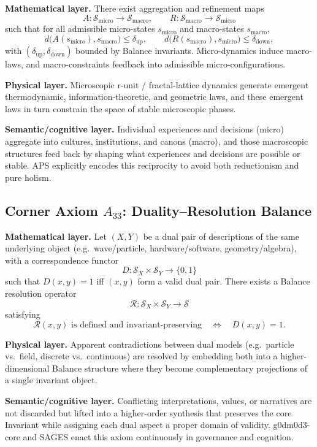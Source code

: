 \begin{axiom}
\label{ax:micro-macro}
\textbf{Mathematical layer.}
There exist aggregation and refinement maps
\[
  A : \mathcal{S}_{\mathrm{micro}} \to \mathcal{S}_{\mathrm{macro}},
  \qquad
  R : \mathcal{S}_{\mathrm{macro}} \to \mathcal{S}_{\mathrm{micro}}
\]
such that for all admissible micro-states $s_{\mathrm{micro}}$ and macro-states $s_{\mathrm{macro}}$,
\[
  d\bigl(A(s_{\mathrm{micro}}), s_{\mathrm{macro}}\bigr) \leq \delta_{\mathrm{up}},
  \qquad
  d\bigl(R(s_{\mathrm{macro}}), s_{\mathrm{micro}}\bigr) \leq \delta_{\mathrm{down}},
\]
with $(\delta_{\mathrm{up}},\delta_{\mathrm{down}})$ bounded by Balance invariants.
Micro-dynamics induce macro-laws, and macro-constraints feedback into admissible micro-configurations.

\textbf{Physical layer.}
Microscopic r-unit / fractal-lattice dynamics generate emergent thermodynamic, information-theoretic, and geometric laws, and these emergent laws in turn constrain the space of stable microscopic phases.\cite{AurphyxThesis,AurphyxFractalQC}

\textbf{Semantic/cognitive layer.}
Individual experiences and decisions (micro) aggregate into cultures, institutions, and canons (macro), and those macroscopic structures feed back by shaping what experiences and decisions are possible or stable.
APS explicitly encodes this reciprocity to avoid both reductionism and pure holism.
\end{axiom}

\subsection{Corner Axiom $A_{33}$: Duality–Resolution Balance}

\begin{axiom}
\label{ax:duality}
\textbf{Mathematical layer.}
Let $(X,Y)$ be a dual pair of descriptions of the same underlying object (e.g.\ wave/particle, hardware/software, geometry/algebra), with a correspondence functor
\[
  D : \mathcal{S}_X \times \mathcal{S}_Y \to \{0,1\}
\]
such that $D(x,y) = 1$ iff $(x,y)$ form a valid dual pair.
There exists a Balance resolution operator
\[
  \mathcal{R} : \mathcal{S}_X \times \mathcal{S}_Y \to \mathcal{S}
\]
satisfying
\[
  \mathcal{R}(x,y) \text{ is defined and invariant-preserving} \quad \Longleftrightarrow \quad D(x,y) = 1.
\]

\textbf{Physical layer.}
Apparent contradictions between dual models (e.g.\ particle vs.\ field, discrete vs.\ continuous) are resolved by embedding both into a higher-dimensional Balance structure where they become complementary projections of a single invariant object.\cite{AurphyxThesis}

\textbf{Semantic/cognitive layer.}
Conflicting interpretations, values, or narratives are not discarded but lifted into a higher-order synthesis that preserves the core Invariant while assigning each dual aspect a proper domain of validity.
g0dm0d3-core and SAGES enact this axiom continuously in governance and cognition.
\end{axiom}

